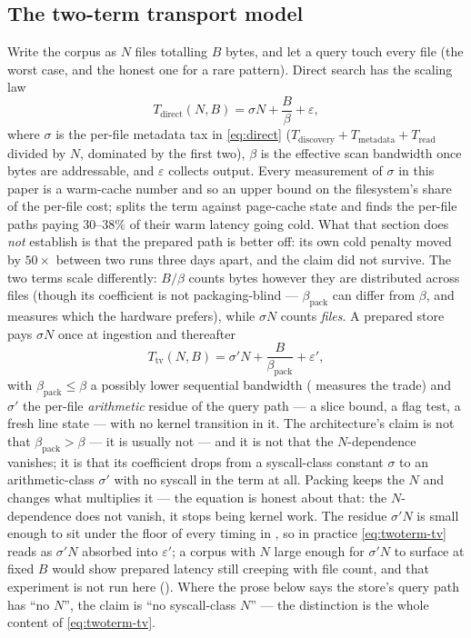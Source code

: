 \documentclass[11pt,letterpaper]{article}
\begin{document}
\subsection{The two-term transport model}
\label{sec:model}
Write the corpus as $N$ files totalling $B$ bytes, and let a query touch
every file (the worst case, and the honest one for a rare pattern). Direct
search has the scaling law
\begin{equation}
\label{eq:twoterm}
T_{\text{direct}}(N,B) = \sigma N + \frac{B}{\beta} + \varepsilon ,
\end{equation}
where $\sigma$ is the per-file metadata tax in
\eqref{eq:direct} ($T_{\text{discovery}}+T_{\text{metadata}}+T_{\text{read}}$
divided by $N$, dominated by the first two), $\beta$ is the effective scan
bandwidth once bytes are addressable, and $\varepsilon$ collects output.
Every measurement of $\sigma$ in this paper is a warm-cache number and so
an upper bound on the filesystem's share of the per-file cost;
 splits the term against page-cache state and finds
the per-file paths paying $30$--$38\%$ of their warm latency going cold.
What that section does \emph{not} establish is that the prepared path is
better off: its own cold penalty moved by $50\times$ between two runs three
days apart, and the claim did not survive.
The two terms scale differently: $B/\beta$ counts bytes however they are
distributed across files (though its coefficient is not packaging-blind ---
$\beta_{\text{pack}}$ can differ from $\beta$, and  measures
which the hardware prefers), while $\sigma N$ counts \emph{files}. A prepared store pays
$\sigma N$ once at ingestion and thereafter
\begin{equation}
\label{eq:twoterm-tv}
T_{\text{tv}}(N,B) = \sigma' N + \frac{B}{\beta_{\text{pack}}} + \varepsilon' ,
\end{equation}
with $\beta_{\text{pack}}\le\beta$ a possibly lower sequential bandwidth
( measures the trade) and $\sigma'$ the per-file
\emph{arithmetic} residue of the query path --- a slice bound, a flag test,
a fresh line state --- with no kernel transition in it. The architecture's
claim is not that $\beta_{\text{pack}}>\beta$ --- it is usually not --- and
it is not that the $N$-dependence vanishes; it is that its coefficient
drops from a syscall-class constant $\sigma$ to an arithmetic-class
$\sigma'$ with no syscall in the term at all. Packing keeps the $N$ and
changes what multiplies it --- the equation is honest about that: the
$N$-dependence does not vanish, it stops being kernel work. The
residue $\sigma' N$ is small enough to sit under the floor of every timing
in , so in practice \eqref{eq:twoterm-tv} reads as
$\sigma' N$ absorbed into $\varepsilon'$; a corpus with $N$ large enough
for $\sigma' N$ to surface at fixed $B$ would show prepared
latency still creeping with file count, and that experiment is not run
here (). Where the prose below says the store's query path has ``no $N$'',
the claim is ``no syscall-class $N$'' --- the distinction is the whole
content of \eqref{eq:twoterm-tv}.
\end{document}
